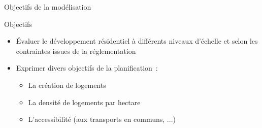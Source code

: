 \documentclass[xcolor=table]{beamer}
\begin{document}
\begin{frame}{Objectifs de la modélisation}
	\begin{block}{Objectifs}
	\begin{itemize}
		\small
		\item<1-> Évaluer le développement résidentiel à différents niveaux d'échelle et selon les contraintes issues de la réglementation
		\item<2-> Exprimer divers objectifs de la planification~: %
		\begin{itemize}	
			\item<3-> La création de logements
			\item<4-> La densité de logements par hectare
			\item<5-> L'accessibilité (aux transports en communs, ...)
		\end{itemize}
		\end{itemize}
	\end{block}
\end{frame}
\end{document}
